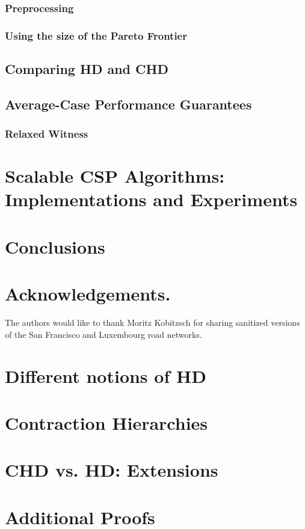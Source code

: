 \documentclass[format=acmsmall, screen=true]{acmart}
\begin{document}
\subsubsection{Preprocessing}
\label{sec:preproc}


\subsubsection{Using the size of the Pareto Frontier}
\label{sec:frontier}


\subsection{Comparing HD and CHD}
\label{ssec:hdvschd}


\subsection{Average-Case Performance Guarantees}
\label{sec:avg_hd}

\subsubsection{Relaxed Witness}
\label{sec:relaxed_witness}


\section{Scalable CSP Algorithms: Implementations and Experiments}
\label{sec:numeric}


\section{Conclusions}
\label{sec:conclu}


\section*{Acknowledgements.}
The authors would like to thank Moritz Kobitzsch for sharing sanitized versions of the San Francisco and Luxembourg road networks.


\appendix
\section{Different notions of HD}
\label{app:generalhd}


\section{Contraction Hierarchies}


\section{CHD vs. HD: Extensions}
\label{app:extn}



\section{Additional Proofs}
\label{sec:proofs}



\end{document}

